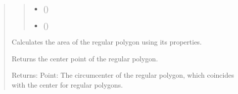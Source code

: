 \documentclass[letterpaper,10pt,english]{sphinxmanual}
\begin{document}
\begin{quote}
\begin{fulllineitems}
\begin{quote}
\begin{description}
\begin{itemize}
\item {} 
\sphinxAtStartPar
{} (\sphinxstyleliteralemphasis{\sphinxupquote{ | }})

\item {} 
\sphinxAtStartPar
{} (\sphinxstyleliteralemphasis{\sphinxupquote{ | }})

\end{itemize}

\end{description}\end{quote}

\begin{fulllineitems}
\label{\detokenize{pygeox:pygeox.custom_objects.RegularPolygon.area}}
\pysigstartsignatures
\pysigline
{}
\pysigstopsignatures
\sphinxAtStartPar
Calculates the area of the regular polygon using its properties.

\end{fulllineitems}


\begin{fulllineitems}
\label{\detokenize{pygeox:pygeox.custom_objects.RegularPolygon.center}}
\pysigstartsignatures
\pysigline
{}
\pysigstopsignatures
\sphinxAtStartPar
Returns the center point of the regular polygon.

\end{fulllineitems}


\begin{fulllineitems}
\label{\detokenize{pygeox:pygeox.custom_objects.RegularPolygon.circumcenter}}
\pysigstartsignatures
\pysigline
{}
\pysigstopsignatures
\sphinxAtStartPar
Returns:
Point: The circumcenter of the regular polygon, which coincides with the center for regular polygons.


\end{fulllineitems}
\end{fulllineitems}
\end{quote}
\end{document}
